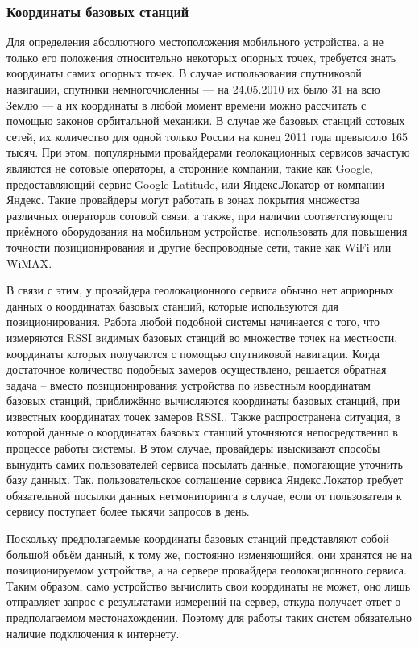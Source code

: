 \subsubsection{Координаты базовых станций}
Для определения абсолютного местоположения мобильного устройства, а не только его положения относительно некоторых опорных точек, требуется знать координаты самих опорных точек. В случае использования спутниковой навигации, спутники немногочисленны --- на 24.05.2010 их было 31\cite{enwikigps} на всю Землю --- а их координаты в любой момент времени можно рассчитать с помощью законов орбитальной механики. В случае же базовых станций сотовых сетей, их количество для одной только России на конец 2011 года превысило 165 тысяч\cite{decodcells}. При этом, популярными провайдерами геолокационных сервисов зачастую являются не сотовые операторы, а сторонние компании, такие как Google, предоставляющий сервис Google Latitude, или Яндекс.Локатор от компании Яндекс\cite{ruwikilbs}. Такие провайдеры могут работать в зонах покрытия множества различных операторов сотовой связи, а также, при наличии соответствующего приёмного оборудования на мобильном устройстве, использовать для повышения точности позиционирования и другие беспроводные сети, такие как WiFi или WiMAX\cite{geolocationapidata}\cite{googlocsource}. 

В связи с этим, у провайдера геолокационного сервиса обычно нет априорных данных о координатах базовых станций, которые используются для позиционирования. Работа любой подобной системы начинается с того, что измеряются RSSI видимых базовых станций во множестве точек на местности, координаты которых получаются с помощью спутниковой навигации. Когда достаточное количество подобных замеров осуществлено, решается обратная задача -- вместо позиционирования устройства по известным координатам базовых станций, приближённо вычисляются координаты базовых станций, при известных координатах точек замеров RSSI.\cite{talberg}. Также распространена ситуация, в которой данные о координатах базовых станций уточняются непосредственно в процессе работы системы. В этом случае, провайдеры изыскивают способы вынудить самих пользователей сервиса посылать данные, помогающие уточнить базу данных. Так, пользовательское соглашение сервиса Яндекс.Локатор требует обязательной посылки данных нетмониторинга в случае, если от пользователя к сервису поступает более тысячи запросов в день\cite{yaloceula}.

Поскольку предполагаемые координаты базовых станций представляют собой большой объём данный, к тому же, постоянно изменяющийся, они хранятся не на позиционируемом устройстве, а на сервере провайдера геолокационного сервиса. Таким образом, само устройство вычислить свои координаты не может, оно лишь отправляет запрос с результатами измерений на сервер, откуда получает ответ о предполагаемом местонахождении\cite{yageloc}. Поэтому для работы таких систем обязательно наличие подключения к интернету.

